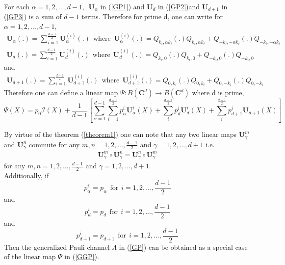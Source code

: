 \documentclass[12pt]{amsart}
\numberwithin{equation}{section}
\begin{document}
For each $\alpha=1,2,...,d-1,~~ \mathbf{U}_\alpha$ in (\ref{GP1}) and $\mathbf{U}_d$ in (\ref{GP2})and $\mathbf{U}_{d+1}$ in (\ref{GP3}) is a sum of $d-1$ terms. Therefore for prime d, 
one can write for $\alpha=1,2,...,d-1$,
\begin{eqnarray*}
    \mathbf{U}_\alpha(.) = \sum_{i=1}^{\frac{d-1}{2}} \mathbf{U}^{(i)}_\alpha(.) ~~\text{where}~~\mathbf{U}^{(i)}_\alpha(.)=Q_{k_i, \alpha k_i}(.)Q_{k_i, \alpha k_i}+Q_{-k_i,-\alpha k_i}(.)Q_{-k_i,-\alpha k_i}
\end{eqnarray*}
\begin{eqnarray*}
    \mathbf{U}_d(.) = \sum_{i=1}^{\frac{d-1}{2}} \mathbf{U}^{(i)}_d(.)~~\text{where}~~\mathbf{U}^{(i)}_d(.)=Q_{k_i, 0}(.)Q_{k_i, 0}+Q_{-k_i,0}(.)Q_{-k_i,0}
\end{eqnarray*} and
\begin{eqnarray*}
    \mathbf{U}_{d+1}(.) = \sum_{i=1}^{\frac{d-1}{2}} \mathbf{U}^{(i)}_{d+1}(.) ~~\text{where}~~\mathbf{U}^{(i)}_{d+1}(.)=Q_{0, k_i}(.)Q_{0, k_i}+Q_{0,-k_i}(.)Q_{0,-k_i}
\end{eqnarray*}
Therefore one can define a linear map $\Psi:B\left(\mathbf{C}^d\right) \rightarrow B\left(\mathbf{C}^d\right)$ where d is prime,
\begin{equation} \label{GGP}
    \Psi(X)=p_0 \mathcal{I} (X)+\frac{1}{d-1}\left[\sum_{\alpha=1}^{d-1} \sum_{i=1}^{\frac{d-1}{2}}p_{\alpha}^{i} \mathbf{U}_{\alpha}^{i}(X)+\sum_{i}^{\frac{d-1}{2}}p_{d}^{i}\mathbf{U}_d^{i}(X)+\sum_{i}^{\frac{d-1}{2}}p_{d+1}^{i}\mathbf{U}_{d+1}(X)\right]
\end{equation}

By virtue of the theorem (\ref{theorem1}) one can note that any two linear maps $\mathbf{U}_\gamma^{m}$ and $\mathbf{U}_\gamma^{n}$ commute for any $m,n=1,2,...,\frac{d-1}{2}$ and $\gamma=1,2,...,d+1$ i.e.
\begin{eqnarray*}
    \mathbf{U}_\gamma^{m} \circ \mathbf{U}_\gamma^{n} = \mathbf{U}_\gamma^{n} \circ \mathbf{U}_\gamma^{m}
\end{eqnarray*}
 for any $m,n=1,2,...,\frac{d-1}{2}$ and $\gamma=1,2,...,d+1$.\\


Additionally,  if \[p_{\alpha}^{i}=p_\alpha~~\text{for}~~i=1,2,...,\frac{d-1}{2}\] and \[p_{d}^{i}=p_d ~~\text{for}~~i=1,2,...,\frac{d-1}{2}\]and\[p_{d+1}^{i}=p_{d+1}~~\text{for}~~i=1,2,...,\frac{d-1}{2}\]
Then the generalized Pauli channel $\Lambda$ in (\ref{GP}) can be obtained as a special case of the linear map $\Psi$ in (\ref{GGP}).\\
\end{document}

